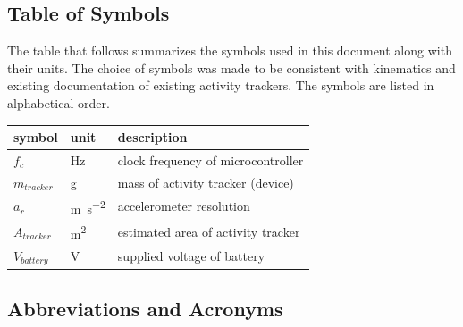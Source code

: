 \documentclass[12pt]{article}
\begin{document}
\subsection{Table of Symbols}

The table that follows summarizes the symbols used in this document along with
their units.  The choice of symbols was made to be consistent with kinematics and existing documentation of existing activity trackers. The symbols are listed in alphabetical order.

\renewcommand{\arraystretch}{1.2}
\noindent \begin{longtable*}{l l p{12cm}} \toprule

\textbf{symbol} & \textbf{unit} & \textbf{description}\\
\midrule
$f_c$ & \si{\Hz} & clock frequency of microcontroller\\
$m_{tracker}$ & \si\g & mass of activity tracker (device)\\
$a_r$ & \si{\metre\per\square\second} & accelerometer resolution\\
$A_{tracker}$ & \si[per-mode=symbol] {\square\metre} & estimated area of activity tracker\\
$V_{battery}$ & \si\V & supplied voltage of battery\\

\bottomrule

\end{longtable*}

\subsection{Abbreviations and Acronyms}

\renewcommand{\arraystretch}{1.2}
\end{document}
